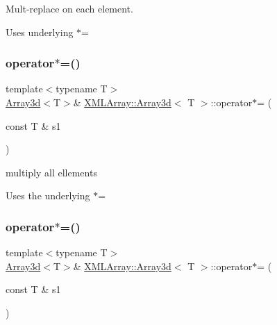 Mult-\/replace on each element. 

Uses underlying $\ast$= \mbox{\label{classXMLArray_1_1Array3d_aff3679dabbd2691243dce85defb9519d}} 
\subsubsection{\texorpdfstring{operator$\ast$=()}{operator*=()}\hspace{0.1cm}{\footnotesize\ttfamily [4/6]}}
{\footnotesize\ttfamily template$<$typename T$>$ \\
\mbox{\hyperlink{classXMLArray_1_1Array3d}{Array3d}}$<$T$>$\& \mbox{\hyperlink{classXMLArray_1_1Array3d}{X\+M\+L\+Array\+::\+Array3d}}$<$ T $>$\+::operator$\ast$= (\begin{DoxyParamCaption}\item[{const T \&}]{s1 }\end{DoxyParamCaption})\hspace{0.3cm}{\ttfamily [inline]}}



multiply all ellements 

Uses the underlying $\ast$= \mbox{\label{classXMLArray_1_1Array3d_aff3679dabbd2691243dce85defb9519d}} 
\subsubsection{\texorpdfstring{operator$\ast$=()}{operator*=()}\hspace{0.1cm}{\footnotesize\ttfamily [5/6]}}
{\footnotesize\ttfamily template$<$typename T$>$ \\
\mbox{\hyperlink{classXMLArray_1_1Array3d}{Array3d}}$<$T$>$\& \mbox{\hyperlink{classXMLArray_1_1Array3d}{X\+M\+L\+Array\+::\+Array3d}}$<$ T $>$\+::operator$\ast$= (\begin{DoxyParamCaption}\item[{const T \&}]{s1 }\end{DoxyParamCaption})\hspace{0.3cm}{\ttfamily [inline]}}



